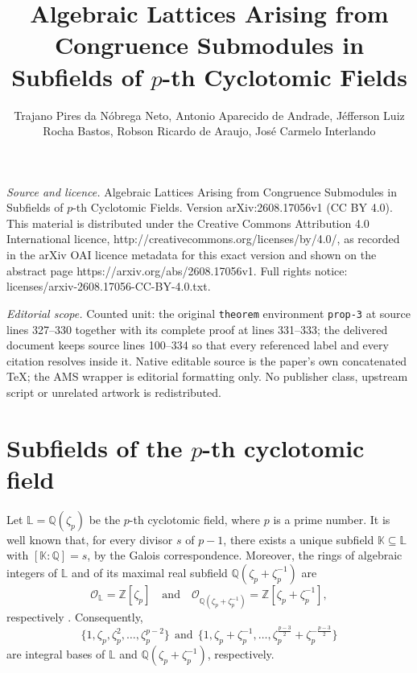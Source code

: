 \documentclass[10pt,a4paper]{amsart}
\begin{document}
\title[Algebraic Lattices Arising from Congruence Submodules in Sub]{Algebraic Lattices Arising from Congruence Submodules in Subfields of $p$-th Cyclotomic Fields}
\author{Trajano Pires da Nóbrega Neto, Antonio Aparecido de Andrade, Jéfferson Luiz Rocha Bastos, Robson Ricardo de Araujo, José Carmelo Interlando}
\date{}
\maketitle
\noindent\emph{Source and licence.} Algebraic Lattices Arising from Congruence Submodules in Subfields of $p$-th Cyclotomic Fields. Version arXiv:2608.17056v1 (CC BY 4.0). This material is distributed under the Creative Commons Attribution 4.0 International licence, http://creativecommons.org/licenses/by/4.0/, as recorded in the arXiv OAI licence metadata for this exact version and shown on the abstract page https://arxiv.org/abs/2608.17056v1. Full rights notice: licenses/arxiv-2608.17056-CC-BY-4.0.txt.\par\smallskip
\noindent\textit{Editorial scope.} Counted unit: the original \texttt{theorem} environment \texttt{prop-3} at source lines 327--330 together with its complete proof at lines 331--333; the delivered document keeps source lines 100--334 so that every referenced label and every citation resolves inside it. Native editable source is the paper's own concatenated TeX; the AMS wrapper is editorial formatting only. No publisher class, upstream script or unrelated artwork is redistributed.
\section{Subfields of the $p$-th cyclotomic field} \label{sec-2}

Let $\mathbb{L}=\mathbb{Q}(\zeta_p)$ be the $p$-th cyclotomic field, where $p$ is a prime number. It is well known that, for every divisor $s$ of $p-1$, there exists a unique subfield $\mathbb{K}\subseteq \mathbb{L}$
with $[\mathbb{K}:\mathbb{Q}]=s$, by the Galois correspondence. Moreover, the rings of algebraic integers of $\mathbb{L}$ and of its maximal real subfield $\mathbb{Q}(\zeta_p+\zeta_p^{-1})$ are
\[ \mathcal{O}_{\mathbb{L}}=\mathbb{Z}[\zeta_p] \quad\text{and}\quad \mathcal{O}_{\mathbb{Q}(\zeta_p+\zeta_p^{-1})} =\mathbb{Z}[\zeta_p+\zeta_p^{-1}], \]
respectively \cite{wash}. Consequently, \[ \{1,\zeta_p,\zeta_p^2,\ldots,\zeta_p^{p-2}\} \ \ \mbox{and} \ \ \{1,\zeta_p+\zeta_p^{-1},\ldots,\zeta_p^{\frac{p-3}{2}}+\zeta_p^{-\frac{p-3}{2}}\} \]
are integral bases of $\mathbb{L}$ and $\mathbb{Q}(\zeta_p+\zeta_p^{-1})$, respectively.
\end{document}
